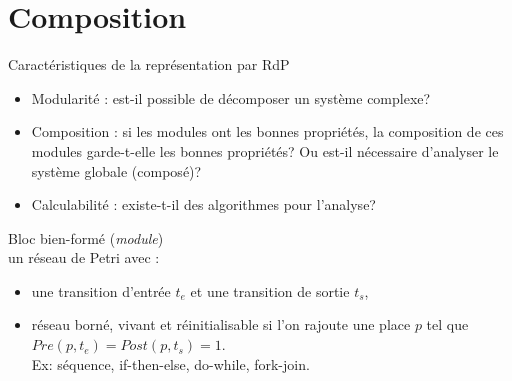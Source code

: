\documentclass[compress]{beamer}
\begin{document}
\section{Composition}
\begin{frame}{Caractéristiques de la représentation par RdP}
\begin{itemize}
\item  {\color{blue}Modularité} : est-il possible de décomposer un système complexe?
\item  {\color{blue}Composition} : si les modules ont les bonnes propriétés, la composition de ces modules garde-t-elle les bonnes propriétés? Ou est-il nécessaire d'analyser le système globale (composé)?
\item  {\color{blue}Calculabilité} : existe-t-il des algorithmes pour l'analyse?
\end{itemize}
{\color{blue} Bloc bien-formé}  ({\it module})   \\ 
un réseau de Petri avec :
\begin{itemize}
\item une transition d'entrée $t_e$ et une transition de sortie $t_s$,
\item réseau borné, vivant et réinitialisable si l'on rajoute une place $p$ tel que $Pre(p,t_e)=Post(p,t_s)=1$. \\
Ex: séquence, if-then-else, do-while, fork-join.
\end{itemize}
\end{frame}

 

%
 
\end{document}

